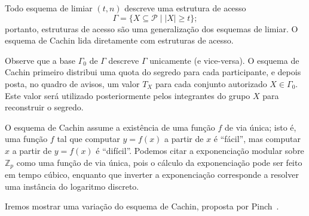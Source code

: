 \documentclass[10pt,twocolumn]{article}
\theoremstyle{definition}
\begin{document}
Todo esquema de limiar $(t, n)$
descreve uma estrutura de acesso
\begin{equation*}
    \Gamma = \{X \subseteq \mathcal P \mid |X| \geq t\};
\end{equation*}
portanto,
estruturas de acesso são uma generalização dos esquemas de limiar.
O esquema de Cachin lida diretamente com estruturas de acesso.

Observe que a base $\Gamma_0$ de $\Gamma$ descreve $\Gamma$ unicamente
(e vice-versa).
O esquema de Cachin primeiro distribui uma quota do segredo para cada participante,
e depois posta, no quadro de avisos, um valor $T_X$
para cada conjunto autorizado $X \in \Gamma_0$.
Este valor será utilizado posteriormente pelos integrantes do grupo $X$
para reconstruir o segredo.

O esquema de Cachin assume a existência de uma função $f$ de via única;
isto é,
uma função $f$ tal que computar $y = f(x)$ a partir de $x$ é ``fácil'',
mas computar $x$ a partir de $y = f(x)$ é ``difícil''.
Podemos citar a exponenciação modular sobre $\mathbb Z_p$
como uma função de via única,
pois o cálculo da exponenciação pode ser feito em tempo cúbico,
enquanto que inverter a exponenciação
corresponde a resolver uma instância do logaritmo discreto.

Iremos mostrar uma variação do esquema de Cachin,
proposta por Pinch~\cite{Pinch1996}.
\end{document}
